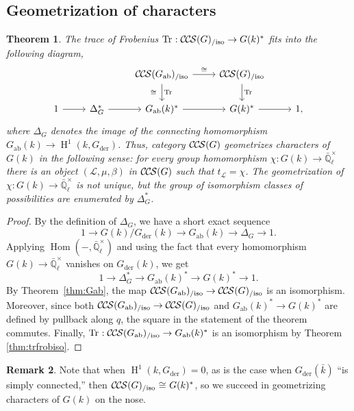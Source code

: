 \documentclass[10pt]{amsart}
\theoremstyle{plain}
\newtheorem{theorem}{Theorem}[section]
\theoremstyle{definition}
\newtheorem{remark}[theorem]{Remark}
\newcommand{\EE}{\mathbb{\bar Q}_\ell}
\newcommand{\bFq}{\bar{k}}
\newcommand{\Fq}{k}
\newcommand{\EEx}{\EE^\times}
\DeclareMathOperator{\Hom}{Hom}
\DeclareMathOperator{\Hh}{H}
\newcommand{\der}{_{\operatorname{der}}}
\newcommand{\ab}{_{\operatorname{ab}}}
\newcommand{\iso}{{\ \cong\ }}
\newcommand{\trFrob}[1]{t_{#1}}
\newcommand{\TrFrob}[1]{\operatorname{Tr}_{#1}}
\newcommand{\cs}[1]{{\mathcal{#1}}}
\newcommand{\CCS}{{\mathcal{C\hskip-.8pt C\hskip-0.8pt S}}}
\newcommand{\CCSiso}[1]{\CCS(#1)_{/\text{iso}}}
\begin{document}
\subsection{Geometrization of characters} \label{ssec:geo}

\begin{theorem}\label{thm:geo}
The trace of Frobenius $\TrFrob{} : \CCSiso{G}\to G(\Fq)^*$ fits into the following diagram,
\[
\begin{tikzcd}
\ & & \CCSiso{G\ab} \arrow{d}{\TrFrob{}}[swap]{\iso} \arrow{r}{\iso} & \CCSiso{G} \arrow{d}{\TrFrob{}}& \\
1 \arrow{r} & \Delta_G^* \arrow{r} & G\ab(k)^* \arrow{r} & G(k)^* \arrow{r} & 1,
\end{tikzcd}
\]
where $\Delta_G$ denotes the image of the connecting homomorphism $G\ab(\Fq) \to \Hh^1(\Fq, G\der)$. 
Thus, category $\CCS(G)$ geometrizes characters of $G(\Fq)$ in the following sense: for every group homomorphism $\chi : G(\Fq) \to \EEx$ there is an object $(\cs{L},\mu,\beta)$ in $\CCS(G)$ such that $\trFrob{\cs{L}} = \chi$. The geometrization of $\chi : G(\Fq) \to \EEx$ is not unique, but the group of isomorphism classes of possibilities are enumerated by $\Delta_G^*$.
\end{theorem}

\begin{proof}
By the definition of $\Delta_G$, we have a short exact sequence
\[
1 \to G(k) / G\der(k) \to G\ab(k) \to \Delta_G \to 1.
\]
Applying $\Hom(-, \EEx)$ and using the fact that every homomorphism $G(k) \to \EEx$ vanishes on $G\der(k)$, we get
\[
1 \to \Delta_G^* \to G\ab(k)^* \to G(k)^* \to 1.
\]
By Theorem~\ref{thm:Gab}, the map $\CCSiso{G\ab} \to \CCSiso{G}$ is an isomorphism.
Moreover, since both $\CCSiso{G\ab} \to \CCSiso{G}$ and $G\ab(k)^* \to G(k)^*$ are
defined by pullback along $q$, the square in the statement of the theorem commutes.
Finally, $\TrFrob{} : \CCSiso{G\ab} \to G\ab(k)^*$ is an isomorphism by Theorem \ref{thm:trfrobiso}.
\end{proof}

\begin{remark}
Note that when $\Hh^1(k,G\der) = 0$, as is the case when $G\der(\bFq)$ ``is simply connected,'' then $\CCSiso{G} \iso G(\Fq)^*$, so
we succeed in geometrizing characters of $G(k)$ on the nose.
\end{remark}
\end{document}
